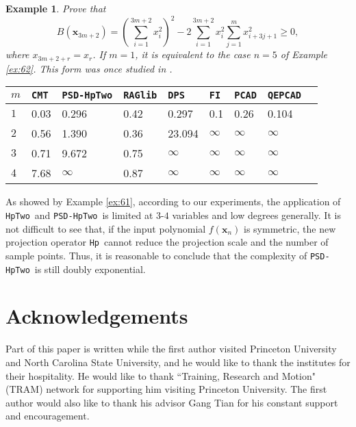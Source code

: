 \documentclass[amsthm]{elsart}
\def  \Hproj {{\tt Hp}}
\def \Proineq {{\tt DPS}}
\newcommand{\xx}{\bm{x}}
\def \RAGlib {{\tt RAGlib}}
\def \FI {{\tt FI}}
\def \QEPCAD {{\tt QEPCAD}}
\def \PCAD {{\tt PCAD}}
\def \TwoPro {{\tt PSD-HpTwo}}
\def \TwoHp {{\tt HpTwo}}
\def \FI {{\tt FI}}
\def \QEPCAD {{\tt QEPCAD}}
\def \PCAD {{\tt PCAD}}
\def \TCPT {{\tt CMT}}
\newtheorem{ex}{Example}   \renewcommand{\algorithmicrequire}{\textsf{Input:}}
\begin{document}
\begin{ex} Prove that
         $$B(\bm{x}_{3m+2})=(\sum_{i=1}^{3m+2}x_i^2)^2-2\sum_{i=1}^{3m+2}x_i^2\sum_{j=1}^mx_{i+3j+1}^2\ge 0,$$
        where $x_{3m+2+r}=x_r$.
        If $m=1$, it is equivalent to the case $n=5$ of Example \ref{ex:62}. This form was once studied in \cite{parrilo2000structured}.
\end{ex}
        \begin{center}
                \begin{tabular}{lllllllll}
                        \hline$m$ &\TCPT& \TwoPro& \RAGlib&   \Proineq   &  \FI& \PCAD&\QEPCAD                \\
                        \hline
                        $1$       &0.03 &0.296&0.42&0.297&0.1&0.26&0.104 \\
                        $2$       &0.56 &1.390&0.36&23.094&$\infty$&$\infty$&$\infty$\\
                        $3$       &0.71 &9.672&0.75&$\infty$&$\infty$&$\infty$&$\infty$\\
            $4$       &7.68 &$\infty$&0.87&$\infty$&$\infty$&$\infty$&$\infty$\\
                        \hline
                \end{tabular}
        \end{center}


\begin{rem}
\begin{comment}
For some special examples like Example \ref{ex:62}, \TwoPro\ could solve problems with more than 30 variables efficiently. Of course, there also exist some other examples on which \TwoPro\ performs badly. For example, \TwoPro\ could not solve the problems in \cite{kaltofen2009proof} within $4000$ seconds while they can be solved by \RAGlib\ efficiently.
\end{comment}

As showed by Example \ref{ex:61}, according to our experiments, the application of \TwoHp\ and \TwoPro\ is limited at $3$-$4$ variables and low degrees generally.
It is not difficult to see that, if the input polynomial $f(\xx_n)$ is symmetric, the new projection operator \Hproj\ cannot reduce the projection scale and the number of sample points.
Thus, it is reasonable to conclude that the complexity of \TwoPro\ is still doubly exponential.
\end{rem}

\section*{Acknowledgements}
Part of this paper is written while the first author visited Princeton University and North Carolina State University, and he would like to thank the institutes for their hospitality. He would like to thank ``Training, Research and Motion" (TRAM) network for supporting him visiting Princeton University. The first author would also like to thank his advisor Gang Tian for his constant support and encouragement.
\end{document}
